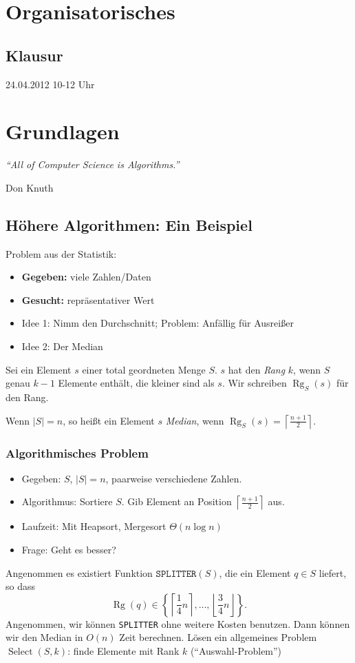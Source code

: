 \chapter{Organisatorisches}
\section{Klausur}
24.04.2012 10-12 Uhr

\chapter{Grundlagen}
\epigraph{
    \textit{"`All of Computer Science is Algorithms."'}
}{Don Knuth}


\section{Höhere Algorithmen: Ein Beispiel}
Problem aus der Statistik:
\begin{itemize}
\item   \textbf{Gegeben:} viele Zahlen/Daten
\item   \textbf{Gesucht:} repräsentativer Wert
\item   Idee 1: Nimm den Durchschnitt; Problem: Anfällig für Ausreißer
\item   Idee 2: Der Median
\end{itemize}

\Defi Sei ein Element $s$ einer total geordneten Menge $S$. $s$ hat den \emph{Rang} $k$, wenn $S$ genau $k-1$ Elemente
    enthält, die kleiner sind als $s$. Wir schreiben $\operatorname{Rg}_S(s)$ für den Rang.
    
\Defi Wenn $|S| = n$, so heißt ein Element $s$ \emph{Median}, wenn 
        $\operatorname{Rg}_S(s) = \left\lceil \frac{n+1}{2} \right\rceil$.

\subsection{Algorithmisches Problem}
\begin{itemize}
\item   Gegeben: $S$, $|S| = n$, paarweise verschiedene Zahlen.
\item   Algorithmus: Sortiere $S$. Gib Element an Position $\left\lceil \frac{n+1}{2} \right\rceil$ aus.
\item   Laufzeit: Mit Heapsort, Mergesort $\Theta(n \log n)$
\item   Frage: Geht es besser?
\end{itemize}
Angenommen es  existiert Funktion $\mathtt{SPLITTER}(S)$, die ein Element $q \in S$ liefert, so dass 
\[
\operatorname{Rg}(q) \in \left\{\left\lceil\frac{1}{4} n\right\rceil, ..., \left\lfloor\frac{3}{4}n\right\rfloor\right\}.
\]
\Lemma  Angenommen, wir können \texttt{SPLITTER} ohne weitere Kosten benutzen. Dann können wir den Median in $O(n)$ Zeit berechnen.
\Bew    Lösen ein allgemeines Problem \\
    $\operatorname{Select}(S, k)$: finde Elemente mit Rank $k$ ("`Auswahl-Problem"') 
